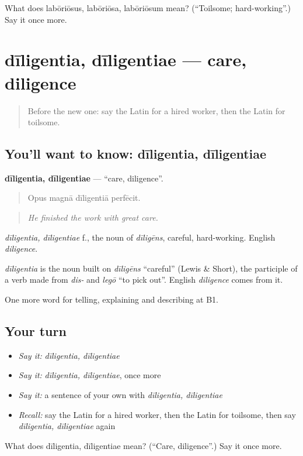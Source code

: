 \begin{tcolorbox}[breakable,colback=teal!4,colframe=teal!35!black,title={Before you move on}]
What does labōriōsus, labōriōsa, labōriōsum mean? (\textquotedblleft{}Toilsome; hard-working\textquotedblright{}.) Say it once more.
\end{tcolorbox}
\section[dīligentia, dīligentiae]{dīligentia, dīligentiae — care, diligence}

\label{lesson:LA-C379-diligentia}



\begin{quote}
Before the new one: say the Latin for a hired worker, then the Latin for toilsome.
\end{quote}

\subsection*{You'll want to know: dīligentia, dīligentiae}
\textbf{dīligentia, dīligentiae} — \textquotedblleft{}care, diligence\textquotedblright{}.

\begin{quote}
Opus magnā dīligentiā perfēcit.
\end{quote}

\begin{quote}
\emph{He finished the work with great care.}
\end{quote}

\emph{dīligentia, dīligentiae} f., the noun of \emph{dīligēns}, careful, hard-working. English \emph{diligence}.

\begin{cousinweb}
\emph{dīligentia} is the noun built on \emph{dīligēns} \textquotedblleft{}careful\textquotedblright{} (Lewis \& Short), the participle of a verb made from \emph{dis-} and \emph{legō} \textquotedblleft{}to pick out\textquotedblright{}. English \emph{diligence} comes from it.
\end{cousinweb}

\begin{grammarlens}[title={What you've built}]
One more word for telling, explaining and describing at B1.
\end{grammarlens}

\subsection*{Your turn}
\begin{itemize}
\raggedright
  \item \emph{Say it:} \emph{dīligentia, dīligentiae}
  \item \emph{Say it:} \emph{dīligentia, dīligentiae}, once more
  \item \emph{Say it:} a sentence of your own with \emph{dīligentia, dīligentiae}
  \item \emph{Recall:} say the Latin for a hired worker, then the Latin for toilsome, then say \emph{dīligentia, dīligentiae} again
\end{itemize}

\begin{tcolorbox}[breakable,colback=teal!4,colframe=teal!35!black,title={Before you move on}]
What does dīligentia, dīligentiae mean? (\textquotedblleft{}Care, diligence\textquotedblright{}.) Say it once more.
\end{tcolorbox}
